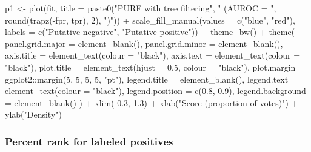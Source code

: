 \documentclass[
  11pt,
  oneside]{book}
\newenvironment{Shaded}{\begin{snugshade}}{\end{snugshade}}
\newcommand{\AttributeTok}[1]{\textcolor[rgb]{0.77,0.63,0.00}{#1}}
\newcommand{\DecValTok}[1]{\textcolor[rgb]{0.00,0.00,0.81}{#1}}
\newcommand{\FloatTok}[1]{\textcolor[rgb]{0.00,0.00,0.81}{#1}}
\newcommand{\FunctionTok}[1]{\textcolor[rgb]{0.00,0.00,0.00}{#1}}
\newcommand{\NormalTok}[1]{#1}
\newcommand{\OtherTok}[1]{\textcolor[rgb]{0.56,0.35,0.01}{#1}}
\newcommand{\SpecialCharTok}[1]{\textcolor[rgb]{0.00,0.00,0.00}{#1}}
\newcommand{\StringTok}[1]{\textcolor[rgb]{0.31,0.60,0.02}{#1}}
\begin{document}
\begin{Shaded}
\begin{Highlighting}[]
\NormalTok{p1 }\OtherTok{\textless{}{-}} \FunctionTok{plot}\NormalTok{(fit, }\AttributeTok{title =} \FunctionTok{paste0}\NormalTok{(}\StringTok{"PURF with tree filtering"}\NormalTok{, }\StringTok{" (AUROC = "}\NormalTok{, }\FunctionTok{round}\NormalTok{(}\FunctionTok{trapz}\NormalTok{(}\SpecialCharTok{{-}}\NormalTok{fpr, tpr), }\DecValTok{2}\NormalTok{), }\StringTok{")"}\NormalTok{)) }\SpecialCharTok{+}
  \FunctionTok{scale\_fill\_manual}\NormalTok{(}\AttributeTok{values =} \FunctionTok{c}\NormalTok{(}\StringTok{"blue"}\NormalTok{, }\StringTok{"red"}\NormalTok{), }\AttributeTok{labels =} \FunctionTok{c}\NormalTok{(}\StringTok{"Putative negative"}\NormalTok{, }\StringTok{"Putative positive"}\NormalTok{)) }\SpecialCharTok{+}
  \FunctionTok{theme\_bw}\NormalTok{() }\SpecialCharTok{+}
  \FunctionTok{theme}\NormalTok{(}
    \AttributeTok{panel.grid.major =} \FunctionTok{element\_blank}\NormalTok{(),}
    \AttributeTok{panel.grid.minor =} \FunctionTok{element\_blank}\NormalTok{(),}
    \AttributeTok{axis.title =} \FunctionTok{element\_text}\NormalTok{(}\AttributeTok{colour =} \StringTok{"black"}\NormalTok{),}
    \AttributeTok{axis.text =} \FunctionTok{element\_text}\NormalTok{(}\AttributeTok{colour =} \StringTok{"black"}\NormalTok{),}
    \AttributeTok{plot.title =} \FunctionTok{element\_text}\NormalTok{(}\AttributeTok{hjust =} \FloatTok{0.5}\NormalTok{, }\AttributeTok{colour =} \StringTok{"black"}\NormalTok{),}
    \AttributeTok{plot.margin =}\NormalTok{ ggplot2}\SpecialCharTok{::}\FunctionTok{margin}\NormalTok{(}\DecValTok{5}\NormalTok{, }\DecValTok{5}\NormalTok{, }\DecValTok{5}\NormalTok{, }\DecValTok{5}\NormalTok{, }\StringTok{"pt"}\NormalTok{),}
    \AttributeTok{legend.title =} \FunctionTok{element\_blank}\NormalTok{(),}
    \AttributeTok{legend.text =} \FunctionTok{element\_text}\NormalTok{(}\AttributeTok{colour =} \StringTok{"black"}\NormalTok{),}
    \AttributeTok{legend.position =} \FunctionTok{c}\NormalTok{(}\FloatTok{0.8}\NormalTok{, }\FloatTok{0.9}\NormalTok{),}
    \AttributeTok{legend.background =} \FunctionTok{element\_blank}\NormalTok{()}
\NormalTok{  ) }\SpecialCharTok{+}
  \FunctionTok{xlim}\NormalTok{(}\SpecialCharTok{{-}}\FloatTok{0.3}\NormalTok{, }\FloatTok{1.3}\NormalTok{) }\SpecialCharTok{+}
  \FunctionTok{xlab}\NormalTok{(}\StringTok{"Score (proportion of votes)"}\NormalTok{) }\SpecialCharTok{+}
  \FunctionTok{ylab}\NormalTok{(}\StringTok{"Density"}\NormalTok{)}
\end{Highlighting}
\end{Shaded}

\hypertarget{percent-rank-for-labeled-positives}{%
\subsubsection{Percent rank for labeled positives}\label{percent-rank-for-labeled-positives}}
\end{document}
